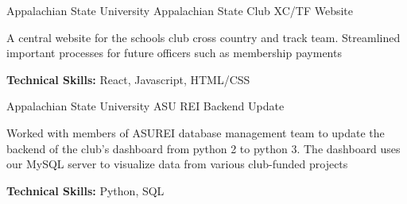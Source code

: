 

\begin{cventries}

  \cventry
    {Appalachian State University} %
    {Appalachian State Club XC/TF Website} %
    {} %
    {} %
    {
      \begin{cvitems} %
        \item {A central website for the schools club cross country and track team. Streamlined important processes for future officers such as membership payments}
        \item {\textbf{Technical Skills:} React, Javascript, HTML/CSS}
      \end{cvitems}
    }

  \cventry
    {Appalachian State University} %
    {ASU REI Backend Update} %
    {} %
    {} %
    {
      \begin{cvitems} %
        \item {Worked with members of ASUREI database management team to update the backend of the club's dashboard from python 2 to python 3. The dashboard uses our MySQL server to visualize data from various club-funded projects}
        \item {\textbf{Technical Skills:} Python, SQL}
      \end{cvitems}
    }


\end{cventries}
